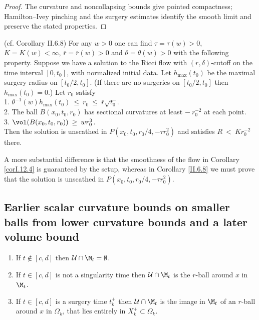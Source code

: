 \begin{proof}
\sketch The curvature and noncollapsing bounds give pointed compactness; Hamilton--Ivey pinching and the surgery estimates identify the smooth limit and preserve the stated properties.
\end{proof}

\begin{corollary}
  \label{cor:kl-double-sided-curvature-bound-thick-part-existence-ricci-flow-surgery}
 \label{II.6.8}
(cf. Corollary II.6.8) For any $w > 0$ one can find
$\tau = \tau(w) > 0$, $K = K(w) < \infty$,
$\overline{r} = \overline{r}(w) > 0$ and $\theta = \theta(w) > 0$ with
the following property. Suppose we have a solution to the Ricci flow
with $(r, \delta)$-cutoff on the time interval $[0, t_0]$, with
normalized initial data.
Let $h_{\max}(t_0)$ be the maximal surgery radius on $[t_0/2, t_0]$.
(If there are no surgeries on $[t_0/2, t_0]$ then $h_{\max}(t_0) = 0$.)
Let $r_0$ satisfy \\
1. $\theta^{-1}(w) h_{\max}(t_0) \: \le \: r_0 \: \le \:
\overline{r} \sqrt{t_0}$.\\
2. The ball $B(x_0, t_0, r_0)$ has sectional curvatures at least
$- \: r_0^{-2}$ at each point.\\
3. $\vol(B(x_0, t_0, r_0)) \: \ge \: w r_0^3$.\\

Then the solution is unscathed in $P(x_0, t_0, r_0/4, - \tau r_0^2)$
and satisfies $R \: < \: Kr_0^{-2}$ there.
\end{corollary}

A more substantial difference is that the smoothness of the flow
in Corollary \ref{corI.12.4}
is guaranteed by the setup, whereas in Corollary \ref{II.6.8} we must
prove that the solution is unscathed in $P(x_0, t_0, r_0/4, - \tau r_0^2)$.

\subsection{Earlier scalar curvature bounds on smaller balls from lower curvature bounds and a later volume bound}
 \label{II.6.5}

\begin{enumerate}
\item If $t \notin [c,d]$ then ${\mathcal U} \cap \M_t = \emptyset$.
\item If $t \in [c,d]$ is not
a singularity time then ${\mathcal U} \cap \M_t$ is the $r$-ball around $x$ in
$\M_t$.
\item If $t \in [c,d]$ is a surgery time $t_k^+$ then
${\mathcal U} \cap \M_t$ is
the image in $\M_t$ of an $r$-ball around $x$ in
$\Omega_k$, that lies entirely in $X_k^+ \subset \Omega_k$.
\end{enumerate}

